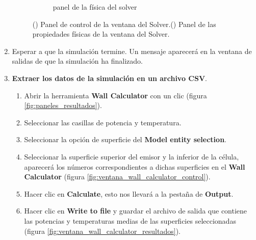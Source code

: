 \begin{enumerate}
\begin{figure}[H]
\begin{subfigure}[b]{0.48\textwidth}
			\caption{panel de la física del solver}
			\label{fig:physics_panel}
		\end{subfigure}
		\caption{() Panel de control de la ventana del Solver.() Panel de las propiedades físicas de la ventana del Solver.}
		\label{fig:panels_Solver}
	\end{figure}
	\item Esperar a que la simulación termine. Un mensaje aparecerá en la ventana de salidas de que la simulación ha finalizado.
	\item \textbf{Extraer los datos de la simulación en un archivo CSV}.\label{it:extraerResCFD}
	\begin{enumerate}
		\item Abrir la herramienta \textbf{Wall Calculator} con un clic (figura \ref{fig:paneles_resultados}).
		\item Seleccionar las casillas de potencia y temperatura.
		\item Seleccionar la opción de superficie del \textbf{Model entity selection}.
		\item Seleccionar la superficie superior del emisor y la inferior de la célula, aparecerá los números correspondientes a dichas superficies en el \textbf{Wall Calculator} (figura \ref{fig:ventana_wall_calculator_control}).
		\item Hacer clic en \textbf{Calculate}, esto nos llevará a la pestaña de \textbf{Output}.
		\item Hacer clic en \textbf{Write to file} y guardar el archivo de salida que contiene las potencias y temperaturas medias de las superficies seleccionadas (figura \ref{fig:ventana_wall_calculator_resultados}).
	\end{enumerate}
	\begin{figure}[H]
		\centering
		\begin{subfigure}[b]{0.48\textwidth}
			\centering

\end{subfigure}
\end{figure}
\end{enumerate}
